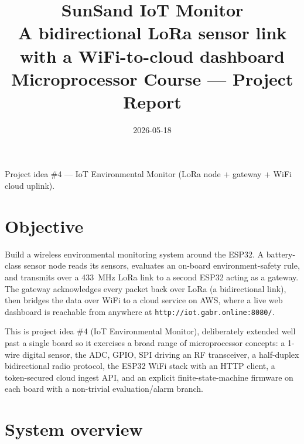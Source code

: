 \documentclass[11pt,a4paper]{article}
\title{\textbf{SunSand IoT Monitor}\\[0.3em]
\large A bidirectional LoRa sensor link with a WiFi-to-cloud dashboard\\[0.4em]
\normalsize Microprocessor Course --- Project Report}
\author{\fillin{team member names + IDs}}
\date{2026-05-18}
\begin{document}
\maketitle
\thispagestyle{empty}
\begin{center}\small\color{mute}
Project idea \#4 --- IoT Environmental Monitor (LoRa node + gateway + WiFi cloud uplink).
\end{center}
\vspace{0.4em}
\tableofcontents
\newpage

\section{Objective}

Build a wireless environmental monitoring system around the ESP32. A
battery-class sensor node reads its sensors, evaluates an on-board
environment-safety rule, and transmits over a 433~MHz LoRa link to a
second ESP32 acting as a gateway. The gateway acknowledges every packet
back over LoRa (a bidirectional link), then bridges the data over WiFi
to a cloud service on AWS, where a live web dashboard is reachable from
anywhere at \texttt{http://iot.gabr.online:8080/}.

This is project idea \#4 (IoT Environmental Monitor), deliberately
extended well past a single board so it exercises a broad range of
microprocessor concepts: a 1-wire digital sensor, the ADC, GPIO, SPI
driving an RF transceiver, a half-duplex bidirectional radio protocol,
the ESP32 WiFi stack with an HTTP client, a token-secured cloud ingest
API, and an explicit finite-state-machine firmware on each board with a
non-trivial evaluation/alarm branch.

\section{System overview}
\end{document}
